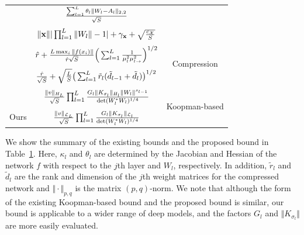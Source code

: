 \documentclass[twoside]{article}
\def\mcl#1{\mathcal{#1}}
\def\opn{\operatorname}
\begin{document}
\begin{table}[t]
\begin{tabular}{c|c|c}
         \citet{ju22}&$\frac{\sum_{l=1}^L\theta_l\Vert W_l-A_l\Vert_{2,2}}{\sqrt{S}}\rule{0pt}{14pt}$& \\
         \citet{li21} & $\Vert \mathbf{x}\Vert\vert\prod_{l=1}^L\Vert W_{l}\Vert-1\vert+\gamma_{\mathbf{x}}+\sqrt{\frac{c_{\mcl{X}}}{S}}\rule{0pt}{12pt}$& \\
         \hline
         \citet{arora18}&$\hat{r}+\frac{L\max_i\Vert f(x_i)\Vert}{\hat{r}\sqrt{S}} \Big(\sum_{l=1}^L\frac{1}{\mu_l^2\mu_{l\rightarrow}^2}\Big)^{1/2}\rule{0pt}{17pt}$&\multirow{2}{*}{Compression}\\ %
         \citet{Suzuki20}& $\frac{\hat{r}}{\sqrt{S}}+\sqrt{\frac{L}{S}}\big(\sum_{l=1}^L\tilde{r}_l(\tilde{d}_{l-1}+\tilde{d}_l)\big)^{1/2}\rule{0pt}{15pt}$ & \\%
         \hline
         \citet{hashimoto2024koopmanbased} & {$\frac{\Vert v\Vert_{H_L} }{\sqrt{S}}\prod_{l=1}^L\frac{ G_l\Vert K_{\sigma_l}\Vert_{H_l}\Vert W_l\Vert^{s_{l-1}}}{\opn{det}(W_l^*W_l)^{1/4}}\rule{0pt}{14pt}$} & \multirow{2}{*}{Koopman-based}\\
         Ours & {$\frac{\Vert v\Vert_{\mcl{L}_L} }{\sqrt{S}}\prod_{l=1}^L\frac{ G_l\Vert K_{\sigma_l}\Vert_{\mcl{L}_l}}{\opn{det}(W_l^*W_l)^{1/4}}\rule{0pt}{14pt}$} &\\ 
         \hline
    \end{tabular}
    \label{tab:existing_bound}
\end{table}

We show the summary of the existing bounds and the proposed bound in Table~\ref{tab:existing_bound}.
Here, $\kappa_l$ and $\theta_l$ are determined by the %
Jacobian and Hessian of the network $f$ with respect to the $j$th layer and $W_l$, respectively.
In addition, $\tilde{r}_l$ and $\tilde{d}_l$ are the rank and dimension of the $j$th weight matrices for the compressed network and $\Vert\cdot\Vert_{p,q}$ is the matrix $(p,q)$-norm.
We note that although the form of the existing Koopman-based bound and the proposed bound is similar, our bound is applicable to a wider range of deep models, and the factors $G_l$ and $\Vert K_{\sigma_l}\Vert$ are more easily evaluated.
\end{document}
